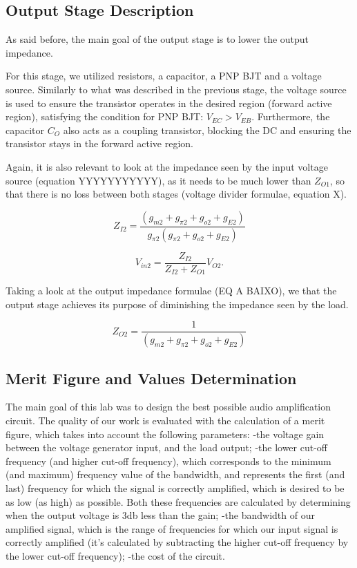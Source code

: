 \subsection{ Output Stage Description}

As said before, the main goal of the output stage is to lower the output impedance.


For this stage, we utilized resistors, a capacitor, a PNP BJT and a voltage source.
Similarly to what was described in the previous stage, the voltage source is used to ensure the transistor operates in the desired region (forward active region), satisfying the condition for PNP BJT: $V_{EC}>V_{EB}$. Furthermore, the capacitor $C_O$ also acts as a coupling transistor, blocking the DC and ensuring the transistor stays in the forward active region.


Again, it is also relevant to look at the impedance seen by the input voltage source (equation YYYYYYYYYYY), as it needs to be much lower than $Z_{O1}$, so that there is no loss between both stages (voltage divider formulae, equation X). 

\begin{equation}
    Z_{I2}=\frac{(g_{m2}+g_{\pi2}+g_{o2}+g_{E2})}{g_{\pi2}(g_{\pi2}+g_{o2}+g_{E2})}
\end{equation}

\begin{equation}
    V_{in2} = \frac{Z_{I2}}{Z_{I2}+Z_{O1}} V_{O2}. 
\end{equation}


Taking a look at the output impedance formulae (EQ A BAIXO), we that the output stage achieves its purpose of diminishing the impedance seen by the load.

\begin{equation}
     Z_{O2}=\frac{1}{(g_{m2}+g_{\pi2}+g_{o2}+g_{E2})}
\end{equation}




\subsection{Merit Figure and Values Determination}

The main goal of this lab was to design the best possible audio amplification circuit. The quality of our work is evaluated with the calculation of a merit figure, which takes into account the following parameters:
-the voltage gain between the voltage generator input, and the load output; 
-the lower cut-off frequency (and higher cut-off frequency), which corresponds to the minimum (and maximum) frequency value of the bandwidth, and represents the first (and last) frequency for which the signal is correctly amplified, which is desired to be as low (as high) as possible. Both these frequencies are calculated by determining when the output voltage is 3db less than the gain;
-the bandwidth of our amplified signal, which is the range of frequencies for which our input signal is correctly amplified (it's calculated by subtracting the higher cut-off frequency by the lower cut-off frequency);
-the cost of the circuit.

